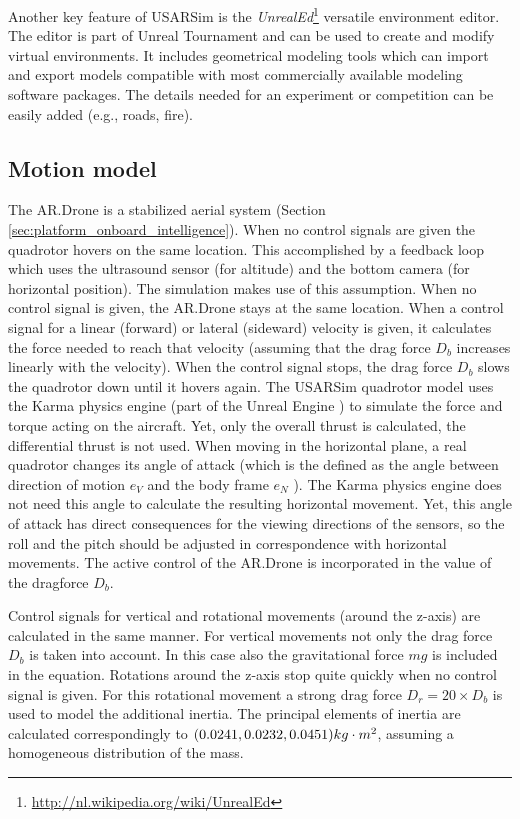 Another key feature of USARSim is the \textit{UnrealEd}\footnote{\url{http://nl.wikipedia.org/wiki/UnrealEd}} versatile environment editor.
The editor is part of Unreal Tournament and can be used to create and modify virtual environments.
It includes geometrical modeling tools which can import and export models compatible with most commercially available modeling software packages.
The details needed for an experiment or competition can be easily added (e.g., roads, fire).



		\subsection{Motion model}
The AR.Drone is a stabilized aerial system (Section \ref{sec:platform_onboard_intelligence}). When no control signals are given the quadrotor hovers on the same location.
This accomplished by a feedback loop which uses the ultrasound sensor (for altitude) and the bottom camera (for horizontal position). The simulation makes use of this assumption. When no control signal is given, the AR.Drone stays at the same location.
When a control signal for a linear (forward) or lateral (sideward) velocity is given, it calculates the force needed to reach that velocity (assuming that the drag force $D_b$ increases linearly with the velocity). When the control signal stops, the drag force $D_b$ slows the quadrotor down until it hovers again.
The USARSim quadrotor model uses the Karma physics engine (part of the Unreal Engine \cite{Carpin2006}) to simulate the force and torque acting on the aircraft. Yet, only the overall thrust is calculated, the differential thrust is not used.
When moving in the horizontal plane, a real quadrotor changes its angle of attack (which is the defined as the angle between direction of motion $e_V$ and the body frame $e_N$ \cite{Yechout2003}). 
The Karma physics engine does not need this angle to calculate the resulting horizontal movement. Yet, this angle of attack has direct consequences for the viewing directions of the sensors, so the roll and the pitch should be adjusted in correspondence with horizontal movements. The active control of the AR.Drone is incorporated in the value of the dragforce $D_b$.

Control signals for vertical and rotational movements (around the z-axis) are calculated in the same manner. For vertical movements not only the drag force $D_b$ is taken into account. In this case also the gravitational force $mg$ is included in the equation. Rotations around the z-axis stop quite quickly when no control signal is given. For this rotational movement a strong drag force $D_r = 20 \times D_b$ is used to model the additional inertia. 
The principal elements of inertia are calculated correspondingly to $(0.0241, 0.0232, 0.0451)\small{kg\cdot m^2}$, assuming a homogeneous distribution of the mass.

